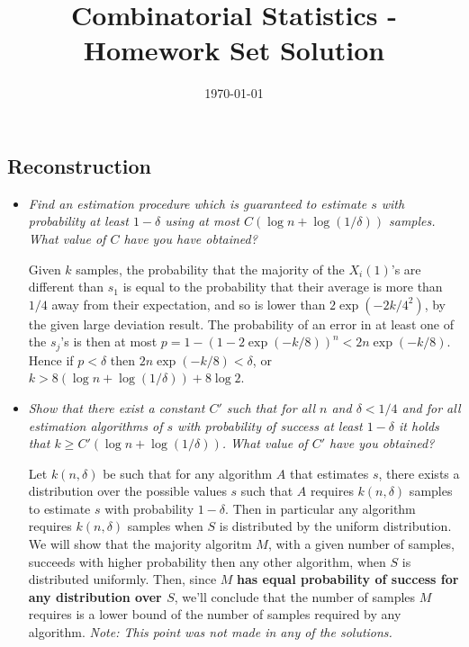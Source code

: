 \documentclass[11pt]{article} \usepackage{amssymb}
\begin{document}
\title{Combinatorial Statistics - Homework Set Solution}

\date{\today}
\maketitle
\subsection{Reconstruction}
\begin{itemize}
\item
{\em Find an estimation procedure which is guaranteed to estimate $s$ with probability at least $1-\delta$ using at most
$C (\log n + \log (1/\delta))$ samples. What value of $C$ have you have obtained?
}

Given $k$ samples, the probability that the majority of  the $X_i(1)$'s are 
different than $s_1$ is equal to the probability that their average is more than
$1/4$ away from their expectation, and so
is lower than $2\exp(-2k/4^2)$, by the given large deviation result. 
The probability of an error in at least one of the $s_j$'s is then at most
$p=1-(1-2\exp(-k/8))^n<2n\exp(-k/8)$. Hence if 
$p<\delta$ then $2n\exp(-k/8)<\delta$, or $k>8\left(\log n+\log(1/\delta)\right)+8\log 2$.

\item
{\em Show that there exist a constant $C'$ such that for all $n$ and $\delta < 1/4$ and for all estimation algorithms of $s$ with
probability of success at least $1-\delta$ it holds that $k \geq C'( \log n + \log (1/\delta))$.
What value of $C'$ have you obtained?
 }

Let $k(n,\delta)$ be such that for any algorithm $A$ that estimates $s$, there
exists a distribution over the possible values $s$ such that $A$ requires
$k(n,\delta)$ samples to estimate $s$ with probability $1-\delta$. Then in particular any 
algorithm requires $k(n,\delta)$ samples when $S$ is distributed by the uniform 
distribution. We will show that the majority algoritm $M$, with a given number
of samples, succeeds with higher probability then any other algorithm,
when $S$ is distributed
uniformly. Then, since $M$ {\bf has equal probability of success for any 
distribution over $S$}, we'll conclude that the number of samples $M$ requires
is a lower bound of the number of samples required by any algorithm. {\em
Note: This point was not made in any of the solutions.}


\end{itemize}
\end{document}
